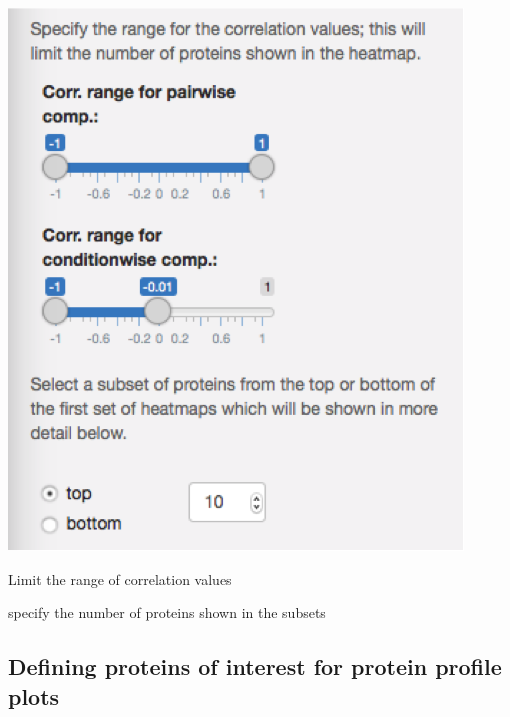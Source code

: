 \documentclass[letterpaper, twocolumn, 9pt]{article}
\begin{document}
\includegraphics[width=\columnwidth]{figures/ss_correlations02.png}

Limit the range of correlation values

specify the number of proteins shown in the subsets


\subsection{Defining proteins of interest for protein profile plots}


\clearpage
\onecolumn

\setlength{\bibsep}{2pt}

\end{document}
